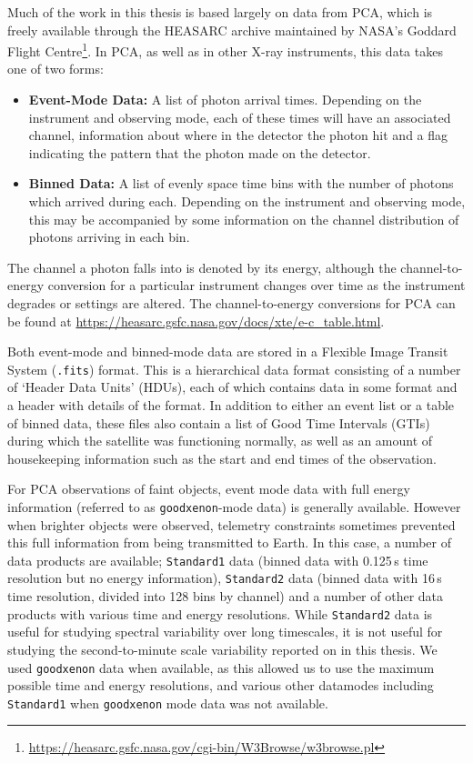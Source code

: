 \par Much of the work in this thesis is based largely on data from PCA, which is freely available through the HEASARC archive maintained by NASA's Goddard Flight Centre\footnote{\url{https://heasarc.gsfc.nasa.gov/cgi-bin/W3Browse/w3browse.pl}}.  In PCA, as well as in other X-ray instruments, this data takes one of two forms:
\begin{itemize}
\item \textbf{Event-Mode Data:} A list of photon arrival times.  Depending on the instrument and observing mode, each of these times will have an associated channel, information about where in the detector the photon hit and a flag indicating the pattern that the photon made on the detector.
\item \textbf{Binned Data:} A list of evenly space time bins with the number of photons which arrived during each.  Depending on the instrument and observing mode, this may be accompanied by some information on the channel distribution of photons arriving in each bin.
\end{itemize}
\par The channel a photon falls into is denoted by its energy, although the channel-to-energy conversion for a particular instrument changes over time as the instrument degrades or settings are altered.  The channel-to-energy conversions for PCA can be found at \url{https://heasarc.gsfc.nasa.gov/docs/xte/e-c_table.html}.
\par Both event-mode and binned-mode data are stored in a Flexible Image Transit System (\texttt{.fits}) format.  This is a hierarchical data format consisting of a number of `Header Data Units' (HDUs), each of which contains data in some format and a header with details of the format.  In addition to either an event list or a table of binned data, these files also contain a list of Good Time Intervals (GTIs) during which the satellite was functioning normally, as well as an amount of housekeeping information such as the start and end times of the observation.
\par For PCA observations of faint objects, event mode data with full energy information (referred to as \texttt{goodxenon}-mode data) is generally available.  However when brighter objects were observed, telemetry constraints sometimes prevented this full information from being transmitted to Earth.  In this case, a number of data products are available; \texttt{Standard1} data (binned data with 0.125\,s time resolution but no energy information), \texttt{Standard2} data (binned data with 16\,s time resolution, divided into 128 bins by channel) and a number of other data products with various time and energy resolutions.  While \texttt{Standard2} data is useful for studying spectral variability over long timescales, it is not useful for studying the second-to-minute scale variability reported on in this thesis.  We used \texttt{goodxenon} data when available, as this allowed us to use the maximum possible time and energy resolutions, and various other datamodes including \texttt{Standard1} when \texttt{goodxenon} mode data was not available.

